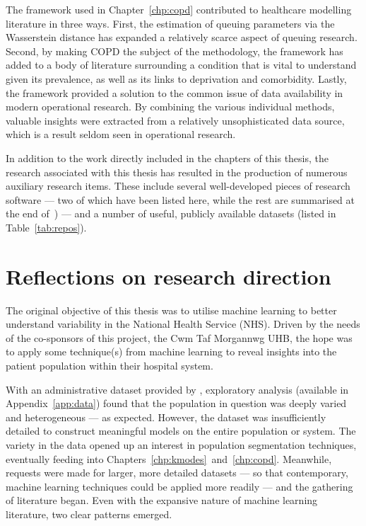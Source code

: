 The framework used in Chapter~\ref{chp:copd} contributed to healthcare modelling
literature in three ways. First, the estimation of queuing parameters via the
Wasserstein distance has expanded a relatively scarce aspect of queuing
research. Second, by making COPD the subject of the methodology, the framework
has added to a body of literature surrounding a condition that is vital to
understand given its prevalence, as well as its links to deprivation and
comorbidity. Lastly, the framework provided a solution to the common issue of
data availability in modern operational research. By combining the various
individual methods, valuable insights were extracted from a relatively
unsophisticated data source, which is a result seldom seen in operational
research.

In addition to the work directly included in the chapters of this thesis, the
research associated with this thesis has resulted in the production of numerous
auxiliary research items. These include several well-developed pieces of
research software --- two of which have been listed here, while the rest are
summarised at the end of~) --- and a number of useful,
publicly available datasets (listed in Table~\ref{tab:repos}).


\section{Reflections on research direction}\label{sec:reflections}

The original objective of this thesis was to utilise machine learning to
better understand variability in the National Health Service (NHS). Driven by
the needs of the co-sponsors of this project, the Cwm Taf Morgannwg UHB, the
hope was to apply some technique(s) from machine learning to reveal insights
into the patient population within their hospital system.

With an administrative dataset provided by \ctmuhb, exploratory analysis
(available in Appendix~\ref{app:data}) found that the population in question was
deeply varied and heterogeneous --- as expected. However, the dataset was
insufficiently detailed to construct meaningful models on the entire population
or system. The variety in the data opened up an interest in population
segmentation techniques, eventually feeding into
Chapters~\ref{chp:kmodes}~and~\ref{chp:copd}. Meanwhile, requests were made for
larger, more detailed datasets --- so that contemporary, machine learning
techniques could be applied more readily --- and the gathering of literature
began. Even with the expansive nature of machine learning literature, two clear
patterns emerged.

